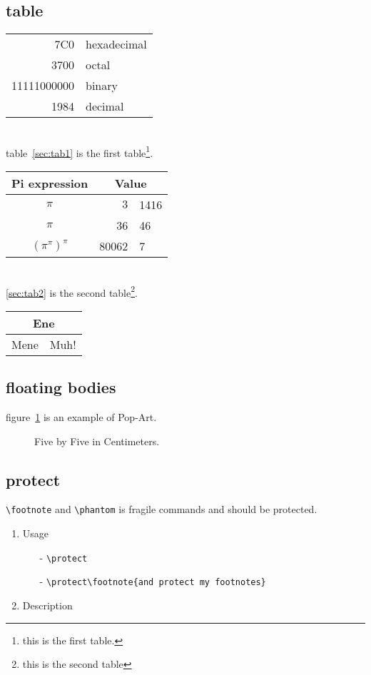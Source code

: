 \documentclass[a4paper, 11pt]{article}
\begin{document}
\subsection{table}
\begin{tabular}{|r|l|}
\hline
7C0 & hexadecimal\\
3700 & octal \\ \cline{2-2}
11111000000 & binary \\
\hline
\hline
1984 & decimal \\
\hline
\end{tabular}\label{sec:tab1}
\\
table~\ref{sec:tab1} is the first table\footnote{this is the first table.}. 
\\
\begin{tabular}{c r @{.} l}
Pi expression & \multicolumn{2}{c}{Value} \\
\hline
$\pi$ & $3$ & 1416\\
$\pi$ & 36 & 46\\
$(\pi^{\pi})^{\pi}$ & 80062 & 7\\
\end{tabular}\label{sec:tab2}\\
\ref{sec:tab2} is the second table\footnote{this is the second table}.\\
\begin{tabular}{|c|c|}
\hline
\multicolumn{2}{|c|}{Ene}\\
\hline
Mene & Muh!\\
\hline
\end{tabular}

\subsection{floating bodies}
figure~\ref{white} is an example of Pop-Art.
\begin{figure}[!hbp]
\makebox[\textwidth]{\framebox[5cm]{\rule{0pt}{5cm}}}
\caption{Five by Five in Centimeters.\label{white}}
\end{figure}

\subsection{protect}
\verb|\footnote| and \verb|\phantom| is fragile commands and should be protected.\\
\begin{enumerate}
\item Usage
\begin{itemize}
\item[-] \verb|\protect|
\item[-] \verb|\protect|\verb|\footnote{and protect my footnotes}|\\
\end{itemize}
\item Description
\end{enumerate}
\end{document}
